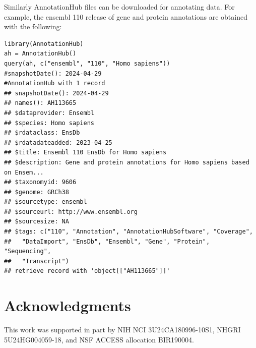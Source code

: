\documentclass[graybox]{svmult}
\begin{document}
Similarly AnnotationHub files can be downloaded for annotating data. For example,
the ensembl 110 release of gene and protein annotations are obtained with the
following:

\begin{shaded}
\begin{verbatim}
library(AnnotationHub)
ah = AnnotationHub()
query(ah, c("ensembl", "110", "Homo sapiens"))
#snapshotDate(): 2024-04-29
#AnnotationHub with 1 record
## snapshotDate(): 2024-04-29
## names(): AH113665
## $dataprovider: Ensembl
## $species: Homo sapiens
## $rdataclass: EnsDb
## $rdatadateadded: 2023-04-25
## $title: Ensembl 110 EnsDb for Homo sapiens
## $description: Gene and protein annotations for Homo sapiens based on Ensem...
## $taxonomyid: 9606
## $genome: GRCh38
## $sourcetype: ensembl
## $sourceurl: http://www.ensembl.org
## $sourcesize: NA
## $tags: c("110", "Annotation", "AnnotationHubSoftware", "Coverage",
##   "DataImport", "EnsDb", "Ensembl", "Gene", "Protein", "Sequencing",
##   "Transcript") 
## retrieve record with 'object[["AH113665"]]' 
\end{verbatim}
\end{shaded}










%

\pagebreak



\section{Acknowledgments}\label{acknowledgments}

This work was supported in part by NIH NCI 3U24CA180996-10S1, NHGRI 5U24HG004059-18, and NSF ACCESS allocation BIR190004.


%


\end{document}
